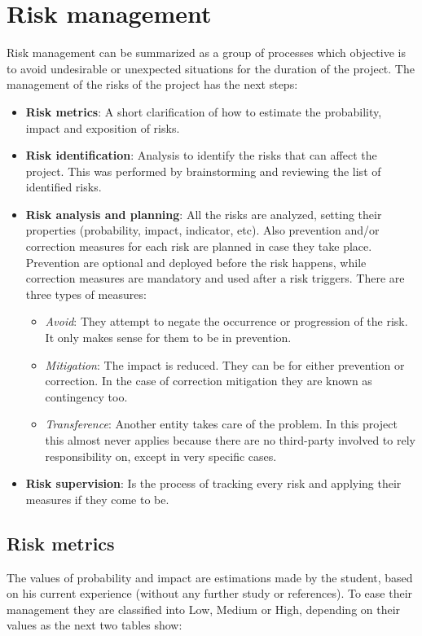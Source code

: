 \section{Risk management}
Risk management can be summarized as a group of processes which objective is to avoid undesirable or unexpected situations for the duration of the project.
\linej
\linej
The management of the risks of the project has the next steps:
\begin{itemize}
	\item \textbf{Risk metrics}: A short clarification of how to estimate the probability, impact and exposition of risks.
	\item \textbf{Risk identification}: Analysis to identify the risks that can affect the project. This was performed by brainstorming and reviewing the list of identified risks.
	\item \textbf{Risk analysis and planning}: All the risks are analyzed, setting their properties (probability, impact, indicator, etc). Also prevention and/or correction measures for each risk are planned in case they take place. Prevention are optional and deployed before the risk happens, while correction measures are mandatory and used after a risk triggers. There are three types of measures:
		\begin{itemize}
			\item \textit{Avoid}: They attempt to negate the occurrence or progression of the risk. It only makes sense for them to be in prevention.
			\item \textit{Mitigation}: The impact is reduced. They can be for either prevention or correction. In the case of correction mitigation they are known as contingency too.
			\item \textit{Transference}: Another entity takes care of the problem. In this project this almost never applies because there are no third-party involved to rely responsibility on, except in very specific cases.
		\end{itemize}
	\item \textbf{Risk supervision}: Is the process of tracking every risk and applying their measures if they come to be.
\end{itemize}

\subsection{Risk metrics}
The values of probability and impact are estimations made by the student, based on his current experience (without any further study or references).
\linej
To ease their management they are classified into Low, Medium or High, depending on their values as the next two tables show:

